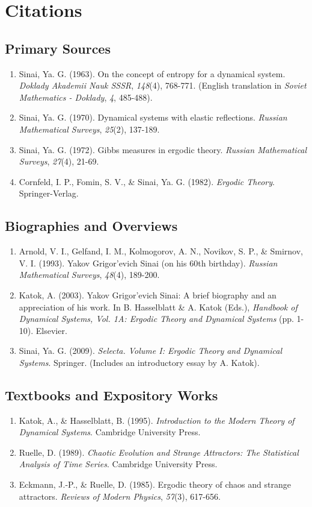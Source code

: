 \section{Citations}

\subsection*{Primary Sources}
\begin{enumerate}
    \item Sinai, Ya. G. (1963). On the concept of entropy for a dynamical system. \textit{Doklady Akademii Nauk SSSR}, \textit{148}(4), 768-771. (English translation in \textit{Soviet Mathematics - Doklady}, \textit{4}, 485-488).
    \item Sinai, Ya. G. (1970). Dynamical systems with elastic reflections. \textit{Russian Mathematical Surveys}, \textit{25}(2), 137-189.
    \item Sinai, Ya. G. (1972). Gibbs measures in ergodic theory. \textit{Russian Mathematical Surveys}, \textit{27}(4), 21-69.
    \item Cornfeld, I. P., Fomin, S. V., \& Sinai, Ya. G. (1982). \textit{Ergodic Theory}. Springer-Verlag.
\end{enumerate}

\subsection*{Biographies and Overviews}
\begin{enumerate}
    \item Arnold, V. I., Gelfand, I. M., Kolmogorov, A. N., Novikov, S. P., \& Smirnov, V. I. (1993). Yakov Grigor'evich Sinai (on his 60th birthday). \textit{Russian Mathematical Surveys}, \textit{48}(4), 189-200.
    \item Katok, A. (2003). Yakov Grigor'evich Sinai: A brief biography and an appreciation of his work. In B. Hasselblatt \& A. Katok (Eds.), \textit{Handbook of Dynamical Systems, Vol. 1A: Ergodic Theory and Dynamical Systems} (pp. 1-10). Elsevier.
    \item Sinai, Ya. G. (2009). \textit{Selecta. Volume I: Ergodic Theory and Dynamical Systems}. Springer. (Includes an introductory essay by A. Katok).
\end{enumerate}

\subsection*{Textbooks and Expository Works}
\begin{enumerate}
    \item Katok, A., \& Hasselblatt, B. (1995). \textit{Introduction to the Modern Theory of Dynamical Systems}. Cambridge University Press.
    \item Ruelle, D. (1989). \textit{Chaotic Evolution and Strange Attractors: The Statistical Analysis of Time Series}. Cambridge University Press.
    \item Eckmann, J.-P., \& Ruelle, D. (1985). Ergodic theory of chaos and strange attractors. \textit{Reviews of Modern Physics}, \textit{57}(3), 617-656.
\end{enumerate}

